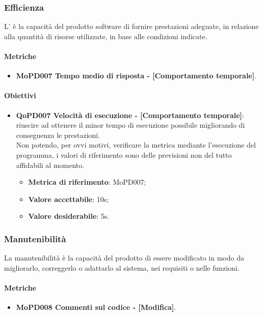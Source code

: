 \documentclass[../piano-di-qualifica.tex]{subfiles}
\begin{document}
\subsubsection{Efficienza}%
\label{sub:efficienza}
L' è la capacità del prodotto software di fornire prestazioni adeguate, in relazione alla quantità di
risorse utilizzate, in base alle condizioni indicate.

\paragraph{Metriche}
\label{sub:metriche}
\begin{itemize}
    \item \textbf{MoPD007 Tempo medio di risposta - [Comportamento temporale]}.
\end{itemize}

\paragraph{Obiettivi}
\label{sub:obiettivi}
\begin{itemize}
    \item \textbf{QoPD007 Velocità di esecuzione - [Comportamento temporale]}: riuscire ad ottenere il minor tempo di esecuzione possibile migliorando di conseguenza le prestazioni.
    \\ Non potendo, per ovvi motivi, verificare la metrica mediante l'esecuzione del programma, i valori di riferimento sono delle previsioni non del tutto affidabili al momento.
        \begin{itemize}
            \item \textbf{Metrica di riferimento}: MoPD007;
            \item \textbf{Valore accettabile}: 10s;
            \item \textbf{Valore desiderabile}: 5s.
        \end{itemize}
\end{itemize}

\subsubsection{Manutenibilità}%
\label{sub:manutenibilita}
La manutenibilità è la capacità del prodotto di essere modificato in modo da migliorarlo, correggerlo o adattarlo al sistema, nei requisiti o nelle funzioni.

\paragraph{Metriche}
\label{sub:metriche}
\begin{itemize}
    \item \textbf{MoPD008 Commenti sul codice - [Modifica]}.
\end{itemize}
\end{document}
